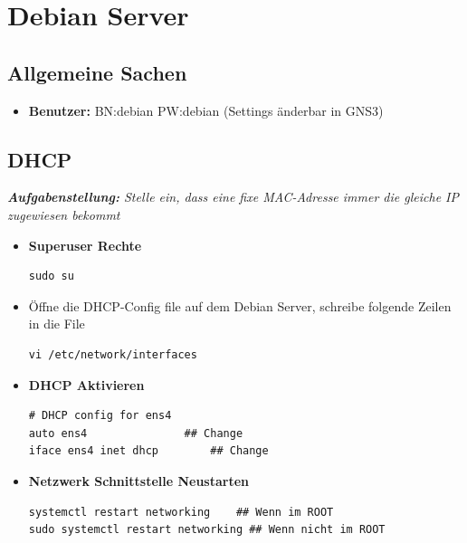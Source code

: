 \section{Debian Server}
\subsection{Allgemeine Sachen}
\begin{itemize}
\item \textbf{Benutzer:} BN:debian PW:debian (Settings änderbar in GNS3)
\end{itemize}
\subsection{DHCP}
\textit{\textbf{Aufgabenstellung:} Stelle ein, dass eine fixe MAC-Adresse immer die gleiche IP zugewiesen bekommt}

\begin{itemize}
\item \textbf{Superuser Rechte}
\begin{verbatim}
sudo su
\end{verbatim}

\item Öffne die DHCP-Config file auf dem Debian Server, schreibe folgende Zeilen in die File
\begin{verbatim}
vi /etc/network/interfaces
\end{verbatim}

\item \textbf{DHCP Aktivieren}
\begin{verbatim}
# DHCP config for ens4
auto ens4				## Change
iface ens4 inet dhcp		## Change
\end{verbatim}

\item \textbf{Netzwerk Schnittstelle Neustarten}
\begin{verbatim}
systemctl restart networking	## Wenn im ROOT
sudo systemctl restart networking ## Wenn nicht im ROOT
\end{verbatim}
\end{itemize}

\newpage

